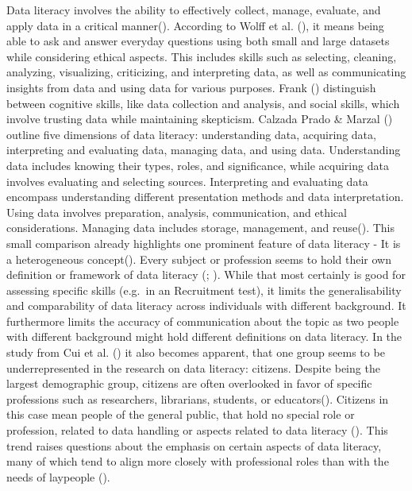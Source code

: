 \documentclass[
  12pt,
  a4paper,
  twoside]{article}
\begin{document}
Data literacy involves the ability to effectively collect, manage, evaluate, and apply data in a critical manner(). According to Wolff et al. (), it means being able to ask and answer everyday questions using both small and large datasets while considering ethical aspects. This includes skills such as selecting, cleaning, analyzing, visualizing, criticizing, and interpreting data, as well as communicating insights from data and using data for various purposes. Frank () distinguish between cognitive skills, like data collection and analysis, and social skills, which involve trusting data while maintaining skepticism. Calzada Prado \& Marzal () outline five dimensions of data literacy: understanding data, acquiring data, interpreting and evaluating data, managing data, and using data. Understanding data includes knowing their types, roles, and significance, while acquiring data involves evaluating and selecting sources. Interpreting and evaluating data encompass understanding different presentation methods and data interpretation. Using data involves preparation, analysis, communication, and ethical considerations. Managing data includes storage, management, and reuse().
This small comparison already highlights one prominent feature of data literacy - It is a heterogeneous concept(). Every subject or profession seems to hold their own definition or framework of data literacy (; ). While that most certainly is good for assessing specific skills (e.g.~in an Recruitment test), it limits the generalisability and comparability of data literacy across individuals with different background. It furthermore limits the accuracy of communication about the topic as two people with different background might hold different definitions on data literacy. In the study from Cui et al. () it also becomes apparent, that one group seems to be underrepresented in the research on data literacy: citizens.
Despite being the largest demographic group, citizens are often overlooked in favor of specific professions such as researchers, librarians, students, or educators(). Citizens in this case mean people of the general public, that hold no special role or profession, related to data handling or aspects related to data literacy (). This trend raises questions about the emphasis on certain aspects of data literacy, many of which tend to align more closely with professional roles than with the needs of laypeople ().
\end{document}
